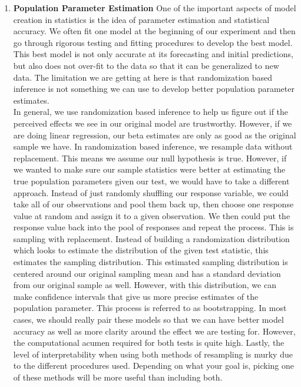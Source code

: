 \begin{enumerate}
	\item \textbf{Population Parameter Estimation} \newline
	One of the important aspects of model creation in statistics is the idea of parameter estimation and statistical accuracy. We often fit one model at the beginning of our experiment and then go through rigorous testing and fitting procedures to develop the best model. This best model is not only accurate at its forecasting and initial predictions, but also does not over-fit to the data so that it can be generalized to new data. The limitation we are getting at here is that randomization based inference is not something we can use to develop better population parameter estimates. \newline\\
	In general, we use randomization based inference to help us figure out if the perceived effects we see in our original model are trustworthy. However, if we are doing linear regression, our beta estimates are only as good as the original sample we have. In randomization based inference, we resample data without replacement. This means we assume our null hypothesis is true. However, if we wanted to make sure our sample statistics were better at estimating the true population parameters given our test, we would have to take a different approach. Instead of just randomly shuffling our response variable, we could take all of our observations and pool them back up, then choose one response value at random and assign it to a given observation. We then could put the response value back into the pool of responses and repeat the process. This is sampling with replacement. Instead of building a randomization distribution which looks to estimate the distribution of the given test statistic, this estimates the sampling distribution. This estimated sampling distribution is centered around our original sampling mean and has a standard deviation from our original sample as well. However, with this distribution, we can make confidence intervals that give us more precise estimates of the population parameter. This process is referred to as bootstrapping. In most cases, we should really pair these models so that we can have better model accuracy as well as more clarity around the effect we are testing for. However, the computational acumen required for both tests is quite high. Lastly, the level of interpretability when using both methods of resampling is murky due to the different procedures used. Depending on what your goal is, picking one of these methods will be more useful than including both. 
\end{enumerate}
